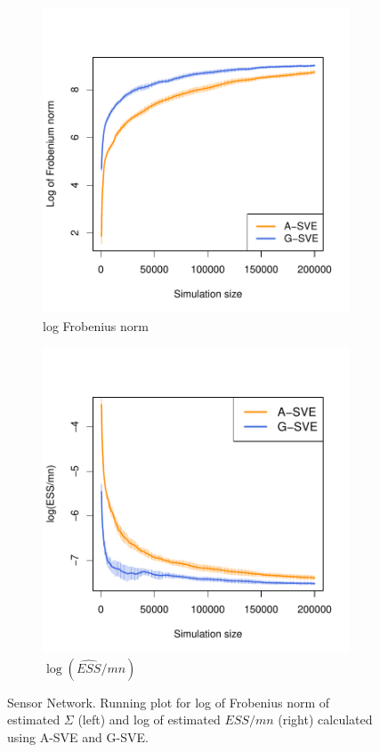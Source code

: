 \documentclass[11pt]{article}
\theoremstyle{remark}
\begin{document}
\begin{figure}
    \centering
    \begin{subfigure}[h]{0.4\textwidth}
      \centering
      \includegraphics[width = \textwidth]{plots/sensor-frob.pdf}
      \caption{log Frobenius norm}
      \label{subfig:sensor-frob}
    \end{subfigure}
    \begin{subfigure}[h]{0.4\textwidth}
      \centering
      \includegraphics[width = \textwidth]{plots/sensor-ess.pdf}
      \caption{$\log(\hat{ESS}/mn)$}
      \label{subfig:sensor-ess}
    \end{subfigure}
    \caption{Sensor Network. Running plot for log of Frobenius norm of estimated $\Sigma$ (left) and log of estimated $ESS/mn$ (right) calculated using A-SVE and G-SVE.}
    \label{fig:sensor-fron_n_ess}
\end{figure}
 
\end{document}

